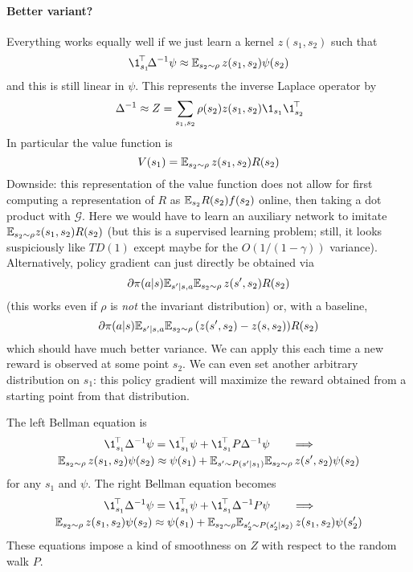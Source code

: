 \documentclass[11pt,a4paper]{article}
\newcommand{\green}{\mathcal{G}}
\begin{document}
\paragraph{Better variant?}
Everything works equally well if we just learn a kernel $z(s_1,s_2)$ such
that
\begin{equation}
\transp{\1_{s_1}}\Delta^{-1}\psi\approx \E_{s_2\sim \rho} \,z(s_1,s_2)
\psi(s_2)
\end{equation}
and this is still linear in $\psi$. This represents the inverse Laplace
operator by
\begin{equation}
\Delta^{-1}\approx Z=\sum_{s_1,s_2}\rho(s_2)  z(s_1,s_2)\1_{s_1}\transp{\1_{s_2}}
\end{equation}
In particular the value function is
\begin{equation}
V(s_1)=\mathbb{E}_{s_2\sim \rho} \, z(s_1,s_2) R(s_2)
\end{equation}
Downside: this representation of the value function does not allow for first
computing a representation of $R$ as $\mathbb{E}_{s_2} R(s_2)f(s_2)$ online, then taking a dot product with
$\green$. Here we would have to learn an auxiliary network to imitate
$\mathbb{E}_{s_2\sim \rho} z(s_1,s_2) R(s_2)$ (but this is a supervised learning
problem; still, it looks suspiciously like $TD(1)$ except maybe for the
$O(1/(1-\gamma))$ variance). Alternatively, policy gradient can just directly be obtained
via
\begin{equation}
\partial \pi(a|s)\mathbb{E}_{s'|s,a} \mathbb{E}_{s_2\sim \rho} \, z(s',s_2)R(s_2)
\end{equation}
(this works even if $\rho$ is \emph{not} the invariant distribution) or,
with a baseline,
\begin{equation}
\partial \pi(a|s)\mathbb{E}_{s'|s,a} \mathbb{E}_{s_2\sim \rho} \, (z(s',s_2)-z(s,s_2))R(s_2)
\end{equation}
which should have much better variance. We
can apply this each time a new reward is observed at some point $s_2$. We
can even set another arbitrary distribution on $s_1$: this policy
gradient will maximize
the reward obtained from a starting point from that distribution.

The left Bellman equation is
\begin{gather}
\transp{\1_{s_1}}\,\Delta^{-1}\psi=\transp{\1_{s_1}}\,\psi+\transp{\1_{s_1}}\,P\Delta^{-1}\psi
\qquad \Longrightarrow
\\
\E_{s_2\sim \rho}
\,z(s_1,s_2)\psi(s_2)
\approx \psi(s_1)+ \E_{s'\sim P(s'|s_1)}
\E_{s_2\sim \rho}\,
z(s',s_2)\psi(s_2)
\end{gather}
for any $s_1$ and $\psi$.
The right Bellman equation becomes
\begin{gather}
\transp{\1_{s_1}}\,\Delta^{-1}\psi=\transp{\1_{s_1}}\,\psi+\transp{\1_{s_1}}\,\Delta^{-1}P\psi
\qquad \Longrightarrow
\\
\E_{s_2\sim \rho}\,
z(s_1,s_2)\psi(s_2)
\approx \psi(s_1)+ \E_{s_2\sim \rho}\E_{s'_2\sim P(s'_2|s_2)}\,
z(s_1,s_2)\psi(s'_2)
\end{gather}
These equations impose a kind of smoothness on $Z$ with respect to the
random walk $P$.
\end{document}
